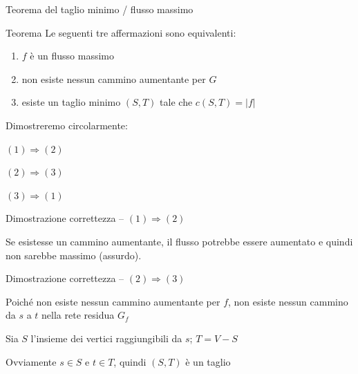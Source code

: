 \begin{frame}{Teorema del taglio minimo / flusso massimo}

\begin{block}{Teorema}
Le seguenti tre affermazioni sono equivalenti:
\begin{enumerate}
\item $f$ è un \alert{flusso massimo}
\item non esiste nessun cammino aumentante per $G$
\item esiste un \alert{taglio minimo} $(S,T)$ tale che $c(S,T) = |f|$
\end{enumerate}
\end{block}

\bigskip
Dimostreremo circolarmente:
\BIL
\item $(1) \Rightarrow (2)$
\item $(2) \Rightarrow (3)$
\item $(3) \Rightarrow (1)$
\EIL

\end{frame}

\begin{frame}{Dimostrazione correttezza -- $(1) \Rightarrow (2)$}


\BIL
\item Se esistesse un cammino aumentante, il flusso potrebbe essere aumentato e quindi non sarebbe massimo (assurdo).
\EIL

\end{frame}

\begin{frame}{Dimostrazione correttezza -- $(2) \Rightarrow (3)$}



\begin{center}
\end{center}

\small
\BI
\item Poiché non esiste nessun cammino aumentante per $f$, non esiste nessun cammino
da $s$ a $t$ nella rete residua $G_f$
\item Sia $S$ l'insieme dei vertici raggiungibili da $s$; $T=V-S$
\item Ovviamente $s \in S$ e $t \in T$, quindi $(S,T)$ è un taglio
\EI

\end{frame}


